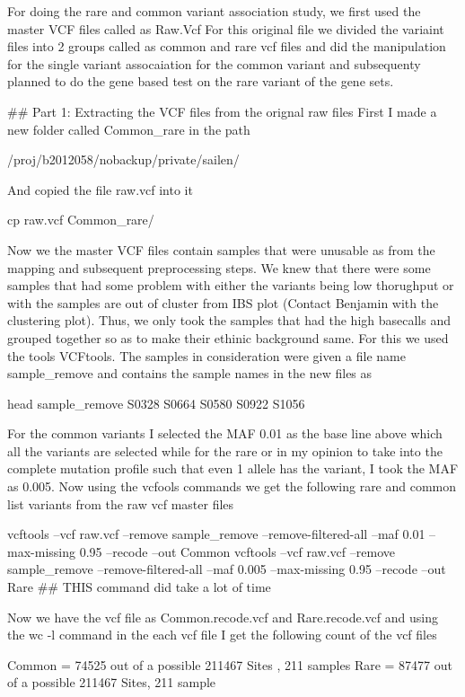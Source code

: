 For doing the rare and common variant association study, we first used the master VCF files called as Raw.Vcf 
For this original file we divided the variaint files into 2 groups called as common and rare vcf files and did the manipulation for the single variant assocaiation for the common variant and subsequenty planned to do the gene based test on the rare variant of the gene sets. 

## Part 1: Extracting the VCF files from the orignal raw files
First I made a new folder called Common_rare in the path 

/proj/b2012058/nobackup/private/sailen/

And copied the file raw.vcf into it

cp raw.vcf Common_rare/

Now we the master VCF files contain samples that were unusable as from the mapping and subsequent preprocessing steps. We knew that there were some samples that had some problem with either the variants being low thorughput or with the samples are out of cluster from IBS plot (Contact Benjamin with the clustering plot). Thus, we only took the samples that had the high basecalls and grouped together so as to make their ethinic background same. For this we used the tools VCFtools. The samples in consideration were given a file name sample_remove and contains the sample names in the new files as
 
head sample_remove
S0328
S0664
S0580
S0922
S1056

For the common variants I selected the MAF 0.01 as the base line above which all the variants are selected while for the rare or
in my opinion to take into the complete mutation profile such that even 1 allele has the variant, I took the MAF as 0.005. Now using the vcfools commands we get the following rare and common list variants from the raw vcf master files

 vcftools --vcf raw.vcf --remove sample_remove --remove-filtered-all --maf 0.01 --max-missing 0.95 --recode --out Common
 vcftools --vcf raw.vcf --remove sample_remove --remove-filtered-all --maf 0.005 --max-missing 0.95 --recode --out Rare
 ## THIS command did take a lot of time 
 
Now we have the vcf file as Common.recode.vcf and Rare.recode.vcf and using the wc -l command in the each vcf file I get the following count of the vcf files

Common = 74525 out of a possible 211467 Sites , 211 samples
Rare = 87477 out of a possible 211467 Sites, 211 sample


